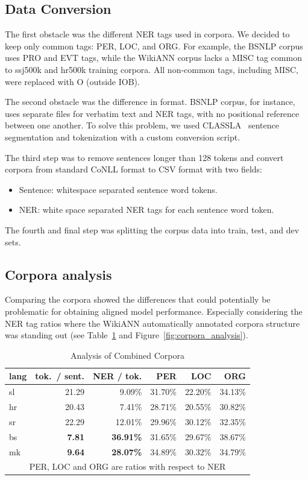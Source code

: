 \documentclass[sigconf]{acmart}
\begin{document}
\subsection{Data Conversion}
\label{subsec:data-conversion}
The first obstacle was the different NER tags used in corpora.
We decided to keep only common tags: PER, LOC, and ORG\@.
For example, the BSNLP corpus uses PRO and EVT tags, while the WikiANN corpus lacks a MISC tag common to ssj500k and hr500k training corpora.
All non-common tags, including MISC, were replaced with O (outside IOB).

The second obstacle was the difference in format.
BSNLP corpus, for instance, uses separate files for verbatim text and NER tags, with no positional reference between one another.
To solve this problem, we used CLASSLA~\cite{ljubesic-dobrovoljc-2019-neural} sentence segmentation and tokenization with a custom conversion script.

The third step was to remove sentences longer than 128 tokens and convert corpora from standard CoNLL format to CSV format with two fields:
\begin{itemize}
  \item Sentence: whitespace separated sentence word tokens.
  \item NER: white space separated NER tags for each sentence word token.
\end{itemize}

The fourth and final step was splitting the corpus data into train, test, and dev sets.

\subsection{Corpora analysis}
\label{subsec:corpora-analysis}
Comparing the corpora showed the differences that could potentially be problematic for obtaining aligned model performance.
Especially considering the NER tag ratios where the WikiANN automatically annotated corpora structure was standing
out (see Table~\ref{tab:corpora_analysis} and Figure~\ref{fig:corpora_analysis}).
\begin{table}[H]
  \caption{Analysis of Combined Corpora}
  \label{tab:corpora_analysis}
  \begin{tabular}{lrrrrr}
    \toprule
    lang&tok.\ / sent.&NER / tok.&PER&LOC&ORG\\
    \midrule
    sl&21.29&9.09\%&31.70\%&22.20\%&34.13\%\\
    hr&20.43&7.41\%&28.71\%&20.55\%&30.82\%\\
    sr&22.29&12.01\%&29.96\%&30.12\%&32.35\%\\
    bs&\textbf{7.81}&\textbf{36.91\%}&31.65\%&29.67\%&38.67\%\\
    mk&\textbf{9.64}&\textbf{28.07\%}&34.89\%&30.32\%&34.79\%\\
    \bottomrule
    \multicolumn{6}{c}{PER, LOC and ORG are ratios with respect to NER}
  \end{tabular}
\end{table}
\end{document}
